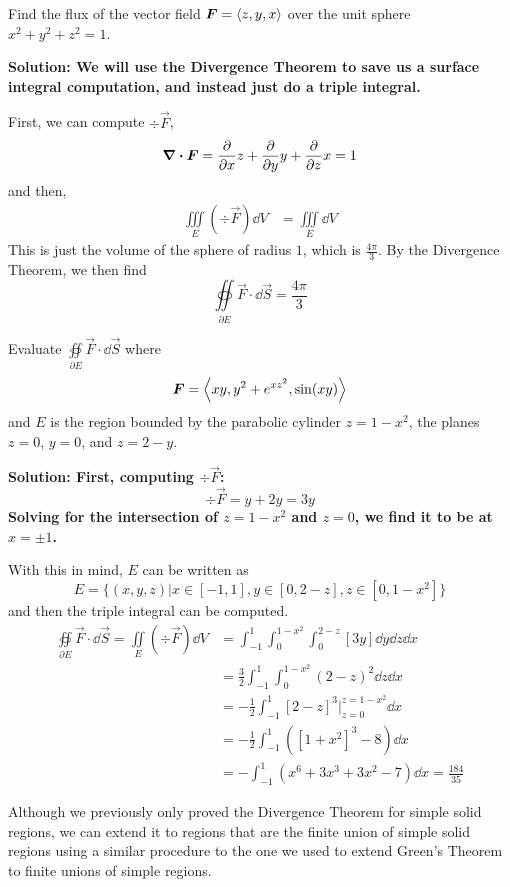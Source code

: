 \begin{example}
    Find the flux of the vector field $\boldsymbol{F} = \left\langle z,y,x\right\rangle$ over the unit sphere $x^2+y^2+z^2=1$. \par
    \bf{Solution:} We will use the Divergence Theorem to save us a surface integral computation, and instead just do a triple integral. \par
    First, we can compute $\div \vec F$,
    \[ \div \boldsymbol{F} = \pdv{x}z + \pdv{y}y + \pdv{z}x = 1\]
    and then,
    \begin{align*}
        \iiint\limits_E (\div \vec F)\dd V &= \iiint\limits_E \dd V
    \end{align*}
    This is just the volume of the sphere of radius $1$, which is $\frac{4\pi}{3}$. By the Divergence Theorem, we then find
    \[ \oiint\limits_{\partial E} \vec F \cdot \dd \vec S = \frac{4\pi}{3} \]
\end{example}
\begin{example}
    Evaluate $\oiint\limits_{\partial E}\vec F \cdot \dd \vec S$ where
    \[ \boldsymbol{F} = \left\langle xy, y^2+e^{xz^2}, \sin(xy) \right\rangle \]
    and $E$ is the region bounded by the parabolic cylinder $z=1-x^2$, the planes $z=0$, $y=0$, and $z=2-y$. \par
    \bf{Solution: }
    First, computing $\div \vec F$: 
    \[ \div \vec F = y + 2y = 3y\]
    Solving for the intersection of $z=1-x^2$ and $z=0$, we find it to be at $x=\pm 1$.\par With this in mind, $E$ can be written as 
    \[ E = \{ (x,y,z)|x\in[-1, 1], y\in[0, 2-z], z\in[0, 1-x^2]\}\]
    and then the triple integral can be computed.
    \begin{align*}
        \oiint\limits_{\partial E} \vec F\cdot\dd \vec S = \iint\limits_E (\div \vec F)\dd V &= \int_{-1}^1\int_0^{1-x^2}\int_0^{2-z}[3y]\dd y\dd z\dd x \\
        &= \frac{3}{2}\int_{-1}^1\int_0^{1-x^2} (2-z)^2\dd z\dd x \\
        &= -\frac{1}{2}\int_{-1}^1[2-z]^3\biggr|_{z=0}^{z=1-x^2}\dd x \\
        &= -\frac{1}{2}\int_{-1}^1 ([1+x^2]^3 - 8)\dd x \\
        &= -\int_{-1}^1 (x^6 + 3x^3 + 3x^2 - 7)\dd x = \frac{184}{35}
    \end{align*}
\end{example}
Although we previously only proved the Divergence Theorem for simple solid regions, we can extend it to regions that are the finite union of simple solid regions using a similar procedure to the one we used to extend Green's Theorem to finite unions of simple regions. \par
